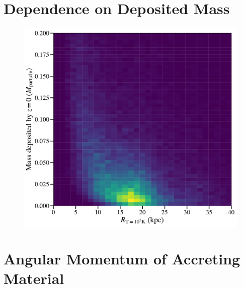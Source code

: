 \documentclass[fleqn,usenatbib]{mnras}
\begin{document}



\appendix

\section{Dependence on Deposited Mass}

\begin{figure}
\includegraphics[width=\columnwidth]{figures/mass_dep_vs_R1e5.pdf}
\label{f: deposited mass vs R1e5}
\end{figure}

\section{Angular Momentum of Accreting Material}
\end{document}
